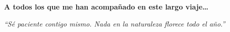 % 
% 
% 
% 
% 
% 
% 
% 

% 
% 

\thispagestyle{empty}

\begin{flushright}

  \vspace*{\fill}

  \textbf{A todos los que me han acompañado en este largo viaje\ldots}\\

  \vspace{3cm}

  \emph{``Sé paciente contigo mismo.
  \newline Nada en la naturaleza florece todo el año.''}

\end{flushright}  

\vspace{4cm}
\vspace*{\fill}




